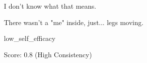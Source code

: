\begin{tcolorbox}[
    colback=gray!5, colframe=gray!50, arc=2mm, boxrule=0.5pt,
    left=5pt, right=5pt, enhanced, drop shadow, breakable
]
\begin{description}[leftmargin=3.5cm, labelwidth=3.2cm, font=\bfseries, nosep]
    \item[Belief] I don't know what that means.
    \item[Action] There wasn't a "me" inside, just... legs moving.
    \item[Belief Type] low\_self\_efficacy
    \item[Metrics] Score: 0.8 (High Consistency)
\end{description}
\end{tcolorbox}

